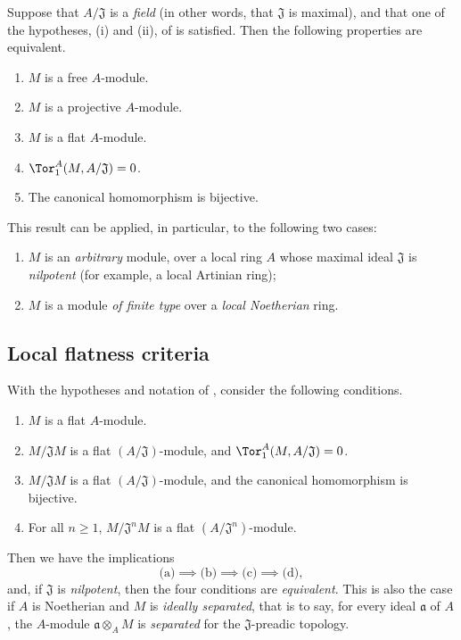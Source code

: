 \begin{env}[10.1.3]
\label{0.10.1.3}
Suppose that $A/\mathfrak{J}$ is a \emph{field} (in other words, that $\mathfrak{J}$ is maximal), and that one of the hypotheses, (i) and (ii), of  is satisfied.
Then the following properties are equivalent.
\begin{enumerate}
  \item[(a)] $M$ is a free $A$-module.
  \item[(b)] $M$ is a projective $A$-module.
  \item[(c)] $M$ is a flat $A$-module.
  \item[(d)] $\Tor_1^A(M,A/\mathfrak{J})=0$.
  \item[(e)] The canonical homomorphism  is bijective.
\end{enumerate}

This result can be applied, in particular, to the following two cases:
\begin{enumerate}
  \item[(i)] $M$ is an \emph{arbitrary} module, over a local ring $A$ whose maximal ideal $\mathfrak{J}$ is \emph{nilpotent} (for example, a local Artinian ring);
  \item[(ii)] $M$ is a module \emph{of finite type} over a \emph{local Noetherian} ring.
\end{enumerate}
\end{env}

\subsection{Local flatness criteria}
\label{subsection:0.10.2}

\begin{env}[10.2.1]
\label{0.10.2.1}
With the hypotheses and notation of , consider the following conditions.
\begin{enumerate}
  \item[(a)] $M$ is a flat $A$-module.
  \item[(b)] $M/\mathfrak{J}M$ is a flat $(A/\mathfrak{J})$-module, and $\Tor_1^A(M,A/\mathfrak{J})=0$.
  \item[(c)] $M/\mathfrak{J}M$ is a flat $(A/\mathfrak{J})$-module, and the canonical homomorphism  is bijective.
  \item[(d)] For all $n\geq1$, $M/\mathfrak{J}^nM$ is a flat $(A/\mathfrak{J}^n)$-module.
\end{enumerate}

Then we have the implications
\[
  \text{(a)}\implies\text{(b)}\implies\text{(c)}\implies\text{(d)},
\]
and, if $\mathfrak{J}$ is \emph{nilpotent}, then the four conditions are \emph{equivalent}.
This is also the case if $A$ is Noetherian and $M$ is \emph{ideally separated}, that is to say, for every ideal $\mathfrak{a}$ of $A$, the $A$-module $\mathfrak{a}\otimes_A M$ is \emph{separated} for the $\mathfrak{J}$-preadic topology.
\end{env}

